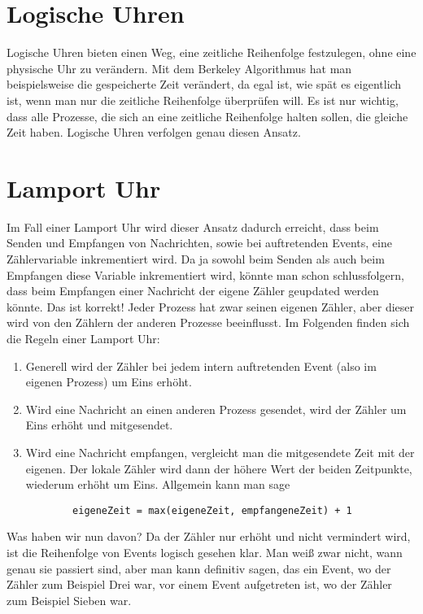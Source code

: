 \documentclass[a4paper,11pt]{report}
\begin{document}
\section{Logische Uhren}
Logische Uhren bieten einen Weg, eine zeitliche Reihenfolge festzulegen, ohne eine physische Uhr zu verändern. Mit dem Berkeley Algorithmus hat man beispielsweise die gespeicherte Zeit verändert, da egal ist, wie spät es eigentlich ist, wenn man nur die zeitliche Reihenfolge überprüfen will. Es ist nur wichtig, dass alle Prozesse, die sich an eine zeitliche Reihenfolge halten sollen, die gleiche Zeit haben. Logische Uhren verfolgen genau diesen Ansatz.

\section{Lamport Uhr}
Im Fall einer Lamport Uhr wird dieser Ansatz dadurch erreicht, dass beim Senden und Empfangen von Nachrichten, sowie bei auftretenden Events, eine Zählervariable inkrementiert wird. Da ja sowohl beim Senden als auch beim Empfangen diese Variable inkrementiert wird, könnte man schon schlussfolgern, dass beim Empfangen einer Nachricht der eigene Zähler geupdated werden könnte. Das ist korrekt! Jeder Prozess hat zwar seinen eigenen Zähler, aber dieser wird von den Zählern der anderen Prozesse beeinflusst. Im Folgenden finden sich die Regeln einer Lamport Uhr:
\begin{enumerate}
	\item Generell wird der Zähler bei jedem intern auftretenden Event (also im eigenen Prozess) um Eins erhöht.
	\item Wird eine Nachricht an einen anderen Prozess gesendet, wird der Zähler um Eins erhöht und mitgesendet.
	\item Wird eine Nachricht empfangen, vergleicht man die mitgesendete Zeit mit der eigenen. Der lokale Zähler wird dann der höhere Wert der beiden Zeitpunkte, wiederum erhöht um Eins. Allgemein kann man sage
	\begin{verbatim}
		eigeneZeit = max(eigeneZeit, empfangeneZeit) + 1
	\end{verbatim}
\end{enumerate}
Was haben wir nun davon? Da der Zähler nur erhöht und nicht vermindert wird, ist die Reihenfolge von Events logisch gesehen klar. Man weiß zwar nicht, wann genau sie passiert sind, aber man kann definitiv sagen, das ein Event, wo der Zähler zum Beispiel Drei war, vor einem Event aufgetreten ist, wo der Zähler zum Beispiel Sieben war.\\
\end{document}
